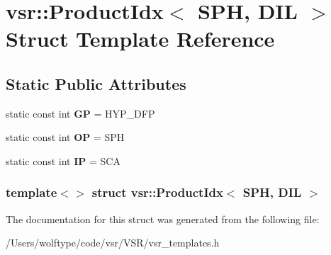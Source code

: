 \hypertarget{structvsr_1_1_product_idx_3_01_s_p_h_00_01_d_i_l_01_4}{\section{vsr\-:\-:Product\-Idx$<$ S\-P\-H, D\-I\-L $>$ Struct Template Reference}
\label{structvsr_1_1_product_idx_3_01_s_p_h_00_01_d_i_l_01_4}
}
\subsection*{Static Public Attributes}
\begin{DoxyCompactItemize}
\item 
\hypertarget{structvsr_1_1_product_idx_3_01_s_p_h_00_01_d_i_l_01_4_a16827aeff0a6ea09b091bdedb342e131}{static const int {\bfseries G\-P} = H\-Y\-P\-\_\-\-D\-F\-P}\label{structvsr_1_1_product_idx_3_01_s_p_h_00_01_d_i_l_01_4_a16827aeff0a6ea09b091bdedb342e131}

\item 
\hypertarget{structvsr_1_1_product_idx_3_01_s_p_h_00_01_d_i_l_01_4_a7fe6900de8e0ff395554f876f0f31da9}{static const int {\bfseries O\-P} = S\-P\-H}\label{structvsr_1_1_product_idx_3_01_s_p_h_00_01_d_i_l_01_4_a7fe6900de8e0ff395554f876f0f31da9}

\item 
\hypertarget{structvsr_1_1_product_idx_3_01_s_p_h_00_01_d_i_l_01_4_a3a4add95b5150f2b6f8b1fa9ddb740dd}{static const int {\bfseries I\-P} = S\-C\-A}\label{structvsr_1_1_product_idx_3_01_s_p_h_00_01_d_i_l_01_4_a3a4add95b5150f2b6f8b1fa9ddb740dd}

\end{DoxyCompactItemize}
\subsubsection*{template$<$$>$ struct vsr\-::\-Product\-Idx$<$ S\-P\-H, D\-I\-L $>$}



The documentation for this struct was generated from the following file\-:\begin{DoxyCompactItemize}
\item 
/\-Users/wolftype/code/vsr/\-V\-S\-R/vsr\-\_\-templates.\-h\end{DoxyCompactItemize}
